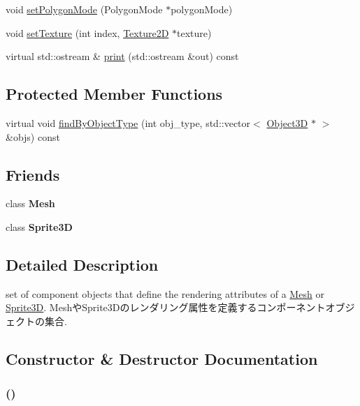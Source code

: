 \begin{CompactItemize}
\item 
void \hyperlink{classm3g_1_1Appearance_cc21fac7868e2ad37e689ac642db1aae}{setPolygonMode} (PolygonMode $\ast$polygonMode)
\item 
void \hyperlink{classm3g_1_1Appearance_493e54b1c7ab839b9e76b28e0629cf6a}{setTexture} (int index, \hyperlink{classm3g_1_1Texture2D}{Texture2D} $\ast$texture)
\item 
virtual std::ostream \& \hyperlink{classm3g_1_1Appearance_6fea17fa1532df3794f8cb39cb4f911f}{print} (std::ostream \&out) const 
\end{CompactItemize}
\subsection*{Protected Member Functions}
\begin{CompactItemize}
\item 
virtual void \hyperlink{classm3g_1_1Appearance_4dadb21b568b0230fac106f15040138c}{findByObjectType} (int obj\_\-type, std::vector$<$ \hyperlink{classm3g_1_1Object3D}{Object3D} $\ast$ $>$ \&objs) const 
\end{CompactItemize}
\subsection*{Friends}
\begin{CompactItemize}
\item 
\hypertarget{classm3g_1_1Appearance_a41a130f156b145bffb3f4b5172c4c93}{
class \textbf{Mesh}}
\label{classm3g_1_1Appearance_a41a130f156b145bffb3f4b5172c4c93}

\item 
\hypertarget{classm3g_1_1Appearance_639cf38c41878a4f0fc8d24c010c96de}{
class \textbf{Sprite3D}}
\label{classm3g_1_1Appearance_639cf38c41878a4f0fc8d24c010c96de}

\end{CompactItemize}


\subsection{Detailed Description}
set of component objects that define the rendering attributes of a \hyperlink{classm3g_1_1Mesh}{Mesh} or \hyperlink{classm3g_1_1Sprite3D}{Sprite3D}. MeshやSprite3Dのレンダリング属性を定義するコンポーネントオブジェクトの集合. 

\subsection{Constructor \& Destructor Documentation}
\hypertarget{classm3g_1_1Appearance_2e594c7b96cb5cfad839a98b57f5d42f}{
\subsubsection[{Appearance}]{ ()}}
\label{classm3g_1_1Appearance_2e594c7b96cb5cfad839a98b57f5d42f}


